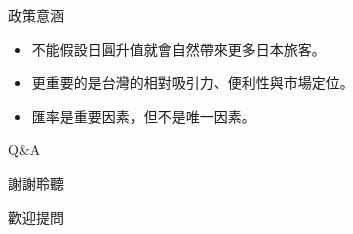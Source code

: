 \documentclass[aspectratio=169]{ctexbeamer}
\begin{document}
\begin{frame}{政策意涵}
\begin{itemize}
  \item 不能假設日圓升值就會自然帶來更多日本旅客。
  \item 更重要的是台灣的相對吸引力、便利性與市場定位。
  \item 匯率是重要因素，但不是唯一因素。
\end{itemize}
\end{frame}

\begin{frame}{Q\&A}
  \vfill
  \centering
  {\Large 謝謝聆聽\par}
  \vspace{0.6em}
  {\large 歡迎提問\par}
  \vfill
\end{frame}
\end{document}
